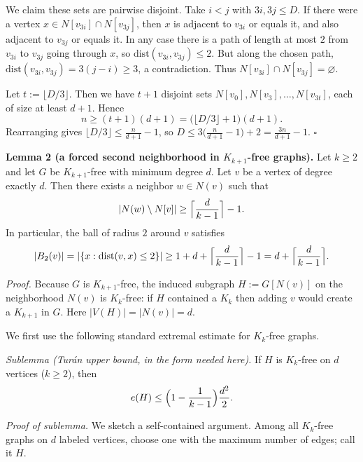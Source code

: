 We claim these sets are pairwise disjoint.
Take $i<j$ with $3i,3j\le D$.
If there were a vertex $x\in N[v_{3i}]\cap N[v_{3j}]$, then
$x$ is adjacent to $v_{3i}$ or equals it, and also adjacent to $v_{3j}$ or equals it.
In any case there is a path of length at most $2$ from $v_{3i}$ to $v_{3j}$ going
through $x$, so
$\mathrm{dist}(v_{3i},v_{3j})\le 2$.
But along the chosen path, $\mathrm{dist}(v_{3i},v_{3j})=3(j-i)\ge 3$, a contradiction.
Thus $N[v_{3i}]\cap N[v_{3j}]=\varnothing$.

Let $t:=\lfloor D/3\rfloor$. Then we have $t+1$ disjoint sets
$N[v_0],N[v_3],\dots,N[v_{3t}]$, each of size at least $d+1$.
Hence
\[
 n \ge (t+1)(d+1) = \bigl(\lfloor D/3\rfloor+1\bigr)(d+1).
\]
Rearranging gives
$\lfloor D/3\rfloor \le \frac{n}{d+1}-1$, so
$D \le 3\bigl(\frac{n}{d+1}-1\bigr)+2 = \frac{3n}{d+1}-1$.
\hfill $\square$

\medskip
\textbf{Lemma 2 (a forced second neighborhood in $K_{k+1}$-free graphs).}
Let $k\ge2$ and let $G$ be $K_{k+1}$-free with minimum degree $d$.
Let $v$ be a vertex of degree exactly $d$.
Then there exists a neighbor $w\in N(v)$ such that
\[
|N(w)\setminus N[v]| \ge \Bigl\lceil \frac{d}{k-1}\Bigr\rceil - 1.
\]
In particular, the ball of radius $2$ around $v$ satisfies
\[
|B_2(v)|=|\{x:\mathrm{dist}(v,x)\le2\}| \ge 1+d+\Bigl\lceil\frac{d}{k-1}\Bigr\rceil-1
= d+\Bigl\lceil\frac{d}{k-1}\Bigr\rceil.
\]

\emph{Proof.}
Because $G$ is $K_{k+1}$-free, the induced subgraph $H:=G[N(v)]$ on the
neighborhood $N(v)$ is $K_k$-free: if $H$ contained a $K_k$ then adding $v$ would
create a $K_{k+1}$ in $G$.
Here $|V(H)|=|N(v)|=d$.

We first use the following standard extremal estimate for $K_k$-free graphs.

\emph{Sublemma (Tur\'an upper bound, in the form needed here).}
If $H$ is $K_k$-free on $d$ vertices ($k\ge2$), then
\[
 e(H) \le \Bigl(1-\frac{1}{k-1}\Bigr)\frac{d^2}{2}.
\]

\emph{Proof of sublemma.}
We sketch a self-contained argument.
Among all $K_k$-free graphs on $d$ labeled vertices, choose one with the maximum
number of edges; call it $H$.

